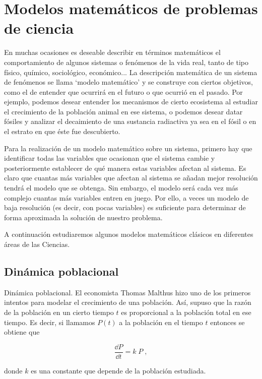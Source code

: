 \section{Modelos matemáticos de problemas de ciencia}

En muchas ocasiones es deseable describir en términos matemáticos el comportamiento de algunos sistemas o fenómenos de la vida real, tanto de tipo físico, químico, sociológico, económico... La descripción matemática de un sistema de fenómenos se llama `modelo matemático' y se construye con ciertos objetivos, como el de entender que ocurrirá en el futuro o que ocurrió en el pasado. Por ejemplo, podemos desear entender los mecanismos de cierto ecosistema al estudiar el crecimiento de la población animal en ese sistema, o podemos desear datar fósiles y analizar el decaimiento de una sustancia radiactiva ya sea en el fósil o en el estrato en que éste fue descubierto. 

Para la realización de un modelo matemático sobre un sistema, primero hay que identificar todas las variables que ocasionan que el sistema cambie y posteriormente establecer de qué manera estas variables afectan al sistema. Es claro que cuantas más variables que afectan al sistema se añadan mejor resolución tendrá el modelo que se obtenga. Sin embargo, el modelo será cada vez más complejo cuantas más variables entren en juego. Por ello, a veces un modelo de baja resolución (es decir, con pocas variables) es suficiente para determinar de forma aproximada la solución de nuestro problema. 

A continuación estudiaremos algunos modelos matemáticos clásicos en diferentes áreas de las Ciencias.

\subsection{Dinámica poblacional}

Dinámica poblacional. 
El economista Thomas Malthus hizo uno de los primeros intentos para modelar el crecimiento de una población. Así, supuso que la razón de la población en un cierto tiempo $t$ es proporcional a la población total en ese tiempo. Es decir, si llamamos $P(t)$ a la población en el tiempo $t$ entonces se obtiene que 

\begin{equation*}
	\dfrac {\dd P}{\dd t}=k\; P\; ,
\end{equation*}

donde $k$ es una constante que depende de la población estudiada.

